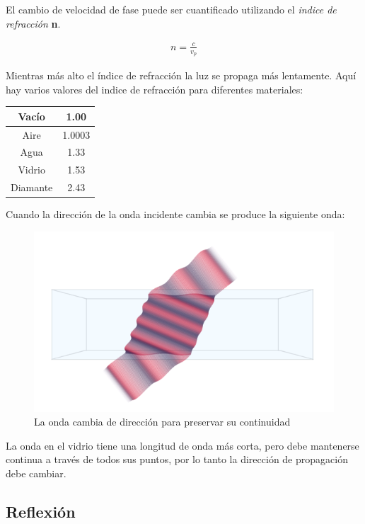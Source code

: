 \documentclass{article}
\begin{document}
El cambio de velocidad de fase puede ser cuantificado utilizando el \textit{indice de refracción} \textbf{n}.

\begin{align*}
	n=\frac{c}{v_p}
\end{align*}

Mientras más alto el índice de refracción la luz se propaga más lentamente. Aquí hay varios valores del indice de refracción para diferentes materiales:

\begin{center}
\begin{tabular}{c c}
	Vacío & 1.00 \\
	\hline
	Aire & 1.0003 \\
	\hline
	Agua & 1.33 \\
	\hline
	Vidrio & 1.53 \\
	\hline
	Diamante & 2.43 \\
\end{tabular}
\end{center} 

Cuando la dirección de la onda incidente cambia se produce la siguiente onda:

\begin{figure}[H]
	\centering
	\includegraphics[width=0.60\linewidth]{Figuras/Index_of_refraction}
	\caption{La onda cambia de dirección para preservar su continuidad}
	\label{fig:indexofrefraction}
\end{figure}

La onda en el vidrio tiene una longitud de onda más corta, pero debe mantenerse continua a través de todos sus puntos, por lo tanto la dirección de propagación debe cambiar.	
	
\subsection{Reflexión}
\end{document}
